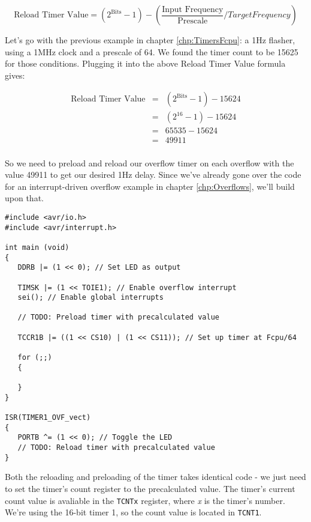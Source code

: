 \documentclass[a4paper,oneside,notitlepage]{book}
\begin{document}
\begin{displaymath}
\text{Reload Timer Value} = (2^\text{Bits} - 1) - (\frac{\text{Input Frequency}}{\text{Prescale}} / Target Frequency) 
\end{displaymath}

Let's go with the previous example in chapter \ref{chp:TimersFcpu}: a 1Hz flasher, using a 1MHz clock and a prescale of 64. We found the timer count to be 15625 for those conditions. Plugging it into the above Reload Timer Value formula gives: 

\begin{displaymath}
\begin{array}{rcl}
\text{Reload Timer Value} & = & (2^\text{Bits} - 1) - 15624 \\
                          & = & (2^{16} - 1) - 15624 \\
                          & = & 65535 - 15624 \\
                          & = & 49911 \\
\end{array}
\end{displaymath}

So we need to preload and reload our overflow timer on each overflow with the value 49911 to get our desired 1Hz delay. Since we've already gone over the code for an interrupt-driven overflow example in chapter \ref{chp:Overflows}, we'll build upon that.

\begin{center}
\begin{lstlisting}
#include <avr/io.h>
#include <avr/interrupt.h>

int main (void)
{
   DDRB |= (1 << 0); // Set LED as output

   TIMSK |= (1 << TOIE1); // Enable overflow interrupt
   sei(); // Enable global interrupts

   // TODO: Preload timer with precalculated value

   TCCR1B |= ((1 << CS10) | (1 << CS11)); // Set up timer at Fcpu/64

   for (;;)
   {

   }
}

ISR(TIMER1_OVF_vect)
{
   PORTB ^= (1 << 0); // Toggle the LED
   // TODO: Reload timer with precalculated value
} 
\end{lstlisting}
\end{center}

Both the reloading and preloading of the timer takes identical code - we just need to set the timer's count register to the precalculated value. The timer's current count value is avaliable in the \texttt{TCNTx} register, where \textit{x} is the timer's number. We're using the 16-bit timer 1, so the count value is located in \texttt{TCNT1}.
\end{document}
